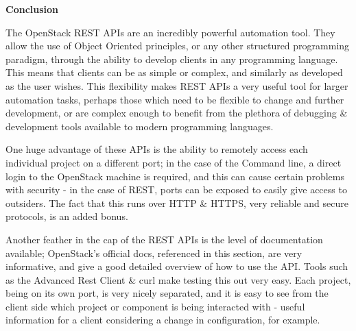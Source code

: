 \textbf{Conclusion}  

The OpenStack REST APIs are an incredibly powerful automation tool. They allow the use of Object Oriented principles, or any other structured programming paradigm, through the ability to develop clients in any programming language. This means that clients can be as simple or complex, and similarly as developed as the user wishes. This flexibility makes REST APIs a very useful tool for larger automation tasks, perhaps those which need to be flexible to change and further development, or are complex enough to benefit from the plethora of debugging \& development tools available to modern programming languages.  

One huge advantage of these APIs is the ability to remotely access each individual project on a different port; in the case of the Command line, a direct login to the OpenStack machine is required, and this can cause certain problems with security - in the case of REST, ports can be exposed to easily give access to outsiders. The fact that this runs over HTTP \& HTTPS, very reliable and secure protocols, is an added bonus. 

Another feather in the cap of the REST APIs is the level of documentation available; OpenStack's official docs, referenced in this section, are very informative, and give a good detailed overview of how to use the API. Tools such as the Advanced Rest Client \& curl make testing this out very easy. Each project, being on its own port, is very nicely separated, and it is easy to see from the client side which project or component is being interacted with - useful information for a client considering a change in configuration, for example. 


